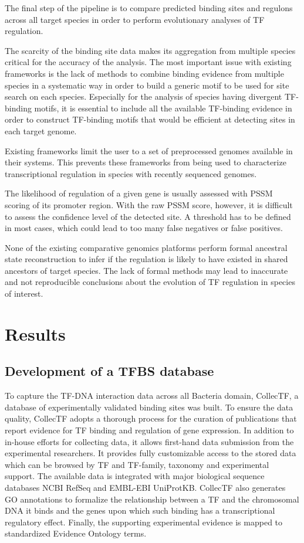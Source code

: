 The final step of the pipeline is to compare predicted binding sites and
regulons across all target species in order to perform evolutionary analyses of
TF regulation.

The scarcity of the binding site data makes its aggregation from multiple
species critical for the accuracy of the analysis. The most important issue
with existing frameworks is the lack of methods to combine binding evidence
from multiple species in a systematic way in order to build a generic motif to
be used for site search on each species. Especially for the analysis of species
having divergent TF-binding motifs, it is essential to include all the
available TF-binding evidence in order to construct TF-binding motifs that
would be efficient at detecting sites in each target genome.

Existing frameworks limit the user to a set of preprocessed genomes available
in their systems. This prevents these frameworks from being used to
characterize transcriptional regulation in species with recently sequenced
genomes.

The likelihood of regulation of a given gene is usually assessed with PSSM
scoring of its promoter region. With the raw PSSM score, however, it is
difficult to assess the confidence level of the detected site. A threshold has
to be defined in most cases, which could lead to too many false negatives or
false positives.

None of the existing comparative genomics platforms perform formal ancestral
state reconstruction to infer if the regulation is likely to have existed in
shared ancestors of target species. The lack of formal methods may lead to
inaccurate and not reproducible conclusions about the evolution of TF
regulation in species of interest.

\section{Results}

\subsection{Development of a TFBS database}

To capture the TF-DNA interaction data across all Bacteria domain, CollecTF, a
database of experimentally validated binding sites was built. To ensure the
data quality, CollecTF adopts a thorough process for the curation of
publications that report evidence for TF binding and regulation of gene
expression. In addition to in-house efforts for collecting data, it allows
first-hand data submission from the experimental researchers. It provides fully
customizable access to the stored data which can be browsed by TF and
TF-family, taxonomy and experimental support. The available data is integrated
with major biological sequence databases NCBI RefSeq and EMBL-EBI
UniProtKB\-. CollecTF also generates GO annotations to formalize the relationship
between a TF and the chromosomal DNA it binds and the genes upon which such
binding has a transcriptional regulatory effect. Finally, the supporting experimental
evidence is mapped to standardized Evidence Ontology terms.

